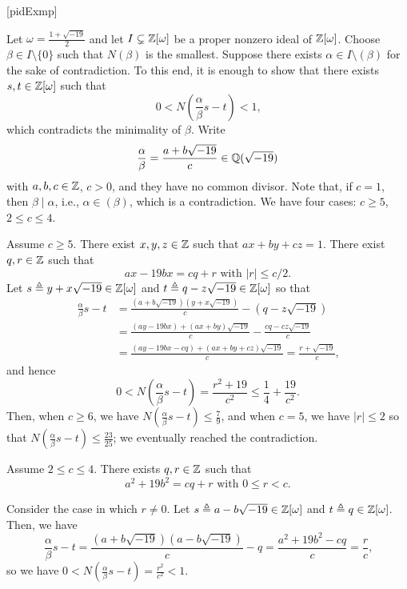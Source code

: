 \documentclass[../modern_algebra_2.tex]{subfiles}
\begin{document}
\begin{Example}{}[pidExmp]
\begin{enumerate}[label=(\roman*), ref=\protect{\Cref{exmp:pidExmp} (\roman*)}]
    Let \(\omega = \frac{1+\sqrt{-19}}{2}\) and let \(I \subsetneq \ZZ{}[\omega]\) be
    a proper nonzero ideal of \(\ZZ{}[\omega]\).
    Choose \(\beta \in I \setminus \{0\}\) such that \(N(\beta)\) is the smallest.
    Suppose there exists \(\alpha \in I \setminus (\beta)\) for the sake of contradiction.
    To this end, it is enough to show that there exists \(s, t \in \ZZ{}[\omega]\)
    such that
    \[
        0 < N \left(\frac{\alpha}{\beta}s - t\right) < 1\text{,}
    \]
    which contradicts the minimality of \(\beta\).
    Write
    \[
        \frac{\alpha}{\beta} = \frac{a+b\sqrt{-19}}{c} \in \QQ(\sqrt{-19})
    \]
    with \(a, b, c \in \ZZ\), \(c > 0\), and they have no common divisor.
    Note that, if \(c = 1\), then \(\beta \mid \alpha\), i.e., \(\alpha \in (\beta)\),
    which is a contradiction.
    We have four cases: \(c \ge 5\), \(2 \le c \le 4\).
    \begin{itemize}
        \ii
        Assume \(c \ge 5\).
        There exist \(x, y, z \in \ZZ\) such that \(ax + by + cz = 1\).
        There exist \(q, r \in \ZZ\) such that
        \[
            ax - 19bx = cq + r\text{ with } |r| \le c/2\text{.}
        \]
        Let \(s \triangleq y + x\sqrt{-19} \in \ZZ{}[\omega]\) and \(t \triangleq q - z\sqrt{-19} \in
        \ZZ{}[\omega]\) so that
        \begin{align*}
            \frac{\alpha}{\beta}s - t
            &= \frac{(a + b\sqrt{-19})(y + x\sqrt{-19})}{c} - (q - z\sqrt{-19}) \\
            &= \frac{(ay - 19bx) + (ax + by)\sqrt{-19}}{c} - \frac{cq - cz\sqrt{-19}}{c} \\
            &= \frac{(ay - 19bx - cq) + (ax + by + cz)\sqrt{-19}}{c} = \frac{r+\sqrt{-19}}{c}\text{,}
        \end{align*}
        and hence
        \[
            0 < N \left(\frac{\alpha}{\beta}s - t\right) = \frac{r^2+19}{c^2} \le \frac{1}{4} +
            \frac{19}{c^2}\text{.}
        \]
        Then, when \(c \ge 6\), we have \(N\left(\frac{\alpha}{\beta}s - t\right) \le \frac{7}{9}\),
        and when \(c = 5\), we have \(|r| \le 2\) so that \(N\left(\frac{\alpha}{\beta}s - t\right)
        \le \frac{23}{25}\); we eventually reached the contradiction.

        \ii
        Assume \(2 \le c \le 4\).
        There exists \(q, r \in \ZZ\) such that
        \[
            a^2 + 19b^2 = cq + r\text{ with }0 \le r < c\text{.}
        \]
        \begin{itemize}
            \ii
            Consider the case in which \(r \neq 0\).
            Let \(s \triangleq a - b\sqrt{-19} \in \ZZ{}[\omega]\) and \(t \triangleq q \in \ZZ{}[
            \omega]\). Then, we have
            \[
                \frac{\alpha}{\beta}s - t = \frac{(a + b\sqrt{-19})(a - b\sqrt{-19})}{c} - q
                = \frac{a^2 + 19b^2 - cq}{c} = \frac{r}{c}\text{,}
            \]
            so we have \(0 < N \left(\frac{\alpha}{\beta}s - t\right) = \frac{r^2}{c^2} < 1\).


\end{itemize}
\end{itemize}
\end{enumerate}
\end{Example}
\end{document}
